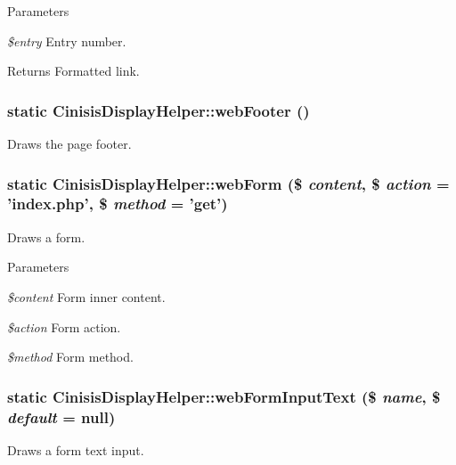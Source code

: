 \begin{DoxyParams}{Parameters}
\item[{\em \$entry}]Entry number.\end{DoxyParams}
\begin{DoxyReturn}{Returns}
Formatted link. 
\end{DoxyReturn}
\hypertarget{classCinisisDisplayHelper_aa331cd95a86ffd270784736e74f253e6}{
\subsubsection[{webFooter}]{\setlength{\rightskip}{0pt plus 5cm}static CinisisDisplayHelper::webFooter ()}}
\label{classCinisisDisplayHelper_aa331cd95a86ffd270784736e74f253e6}
Draws the page footer. \hypertarget{classCinisisDisplayHelper_a7ba5dd0ddd1ba9de5efdbfa1b62d4efa}{
\subsubsection[{webForm}]{\setlength{\rightskip}{0pt plus 5cm}static CinisisDisplayHelper::webForm (\$ {\em content}, \/  \$ {\em action} = {\ttfamily 'index.php'}, \/  \$ {\em method} = {\ttfamily 'get'})}}
\label{classCinisisDisplayHelper_a7ba5dd0ddd1ba9de5efdbfa1b62d4efa}
Draws a form.


\begin{DoxyParams}{Parameters}
\item[{\em \$content}]Form inner content.\item[{\em \$action}]Form action.\item[{\em \$method}]Form method. \end{DoxyParams}
\hypertarget{classCinisisDisplayHelper_a4c8934dc88cda9c7a894106b4dc7abba}{
\subsubsection[{webFormInputText}]{\setlength{\rightskip}{0pt plus 5cm}static CinisisDisplayHelper::webFormInputText (\$ {\em name}, \/  \$ {\em default} = {\ttfamily null})}}
\label{classCinisisDisplayHelper_a4c8934dc88cda9c7a894106b4dc7abba}
Draws a form text input.


